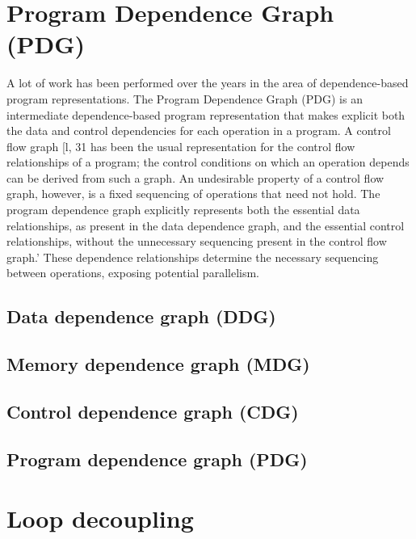 \section{Program Dependence Graph (PDG)} \label{background-program-dependence-graph}
\qquad A lot of work has been performed over the years in the area of dependence-based program representations. \newline 
\null\qquad The Program Dependence Graph (PDG) is an intermediate dependence-based program representation that makes explicit both the data and control dependencies for each operation in a program. A control flow graph [l, 31 has
been the usual representation for the control flow relationships of a program; the control conditions on which an operation depends can be derived from such a
graph. An undesirable property of a control flow graph, however, is a fixed
sequencing of operations that need not hold. The program dependence graph
explicitly represents both the essential data relationships, as present in the data dependence graph, and the essential control relationships, without the unnecessary sequencing present in the control flow graph.’ These dependence relationships determine the necessary sequencing between operations, exposing potential parallelism. 




\subsection{Data dependence graph (DDG)} \label{background-ddg}
\subsection{Memory dependence graph (MDG)} \label{background-mdg}
\subsection{Control dependence graph (CDG)} \label{background-cdg}
\subsection{Program dependence graph (PDG)} \label{background-pdg}

\section{Loop decoupling} \label{background-loop-decoupling}

\cite{iterator-recognition}